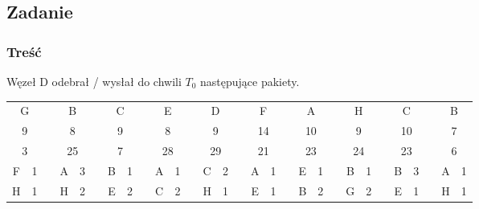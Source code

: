 \documentclass[a4paper,twoside]{article}
\begin{document}
\subsection{Zadanie}
\subsubsection{Treść}
Węzeł D odebrał / wysłał do chwili $ T_0 $ następujące pakiety.\\
\begin{tabular}{|c|c|c|c|c|c|c|c|c|c|c|c|c|c|c|c|c|c|c|c|c|c|c|c|c|c|c|c|c|}
	\cline{1-2} \cline{4-5} \cline{7-8} \cline{10-11} \cline{13-14} \cline{16-17} \cline{19-20} \cline{22-23} \cline{25-26} \cline{28-29}
	\multicolumn{2}{|c|}{G} &  & \multicolumn{2}{c|}{B}  &  & \multicolumn{2}{c|}{C} &  & \multicolumn{2}{c|}{E}  &  & \multicolumn{2}{c|}{D}  &  & \multicolumn{2}{c|}{F}  &  & \multicolumn{2}{c|}{A}  &  & \multicolumn{2}{c|}{H}  &  & \multicolumn{2}{c|}{C}  &  & \multicolumn{2}{c|}{B} \\ \cline{1-2} \cline{4-5} \cline{7-8} \cline{10-11} \cline{13-14} \cline{16-17} \cline{19-20} \cline{22-23} \cline{25-26} \cline{28-29} 
	\multicolumn{2}{|c|}{9} &  & \multicolumn{2}{c|}{8}  &  & \multicolumn{2}{c|}{9} &  & \multicolumn{2}{c|}{8}  &  & \multicolumn{2}{c|}{9}  &  & \multicolumn{2}{c|}{14} &  & \multicolumn{2}{c|}{10} &  & \multicolumn{2}{c|}{9}  &  & \multicolumn{2}{c|}{10} &  & \multicolumn{2}{c|}{7} \\ \cline{1-2} \cline{4-5} \cline{7-8} \cline{10-11} \cline{13-14} \cline{16-17} \cline{19-20} \cline{22-23} \cline{25-26} \cline{28-29} 
	\multicolumn{2}{|c|}{3} &  & \multicolumn{2}{c|}{25} &  & \multicolumn{2}{c|}{7} &  & \multicolumn{2}{c|}{28} &  & \multicolumn{2}{c|}{29} &  & \multicolumn{2}{c|}{21} &  & \multicolumn{2}{c|}{23} &  & \multicolumn{2}{c|}{24} &  & \multicolumn{2}{c|}{23} &  & \multicolumn{2}{c|}{6} \\ \cline{1-2} \cline{4-5} \cline{7-8} \cline{10-11} \cline{13-14} \cline{16-17} \cline{19-20} \cline{22-23} \cline{25-26} \cline{28-29} 
	F          & 1          &  & A           & 3         &  & B          & 1         &  & A           & 1         &  & C           & 2         &  & A           & 1         &  & E           & 1         &  & B           & 1         &  & B           & 3         &  & A          & 1         \\ \cline{1-2} \cline{4-5} \cline{7-8} \cline{10-11} \cline{13-14} \cline{16-17} \cline{19-20} \cline{22-23} \cline{25-26} \cline{28-29} 
	H          & 1          &  & H           & 2         &  & E          & 2         &  & C           & 2         &  & H           & 1         &  & E           & 1         &  & B           & 2         &  & G           & 2         &  & E           & 1         &  & H          & 1         \\ \cline{1-2} \cline{4-5} \cline{7-8} \cline{10-11} \cline{13-14} \cline{16-17} \cline{19-20} \cline{22-23} \cline{25-26} \cline{28-29} 

\end{tabular}
\end{document}
